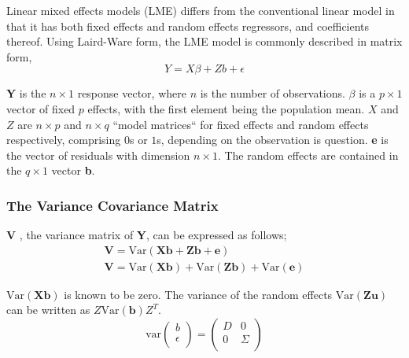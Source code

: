\documentclass[12pt, a4paper]{report}
\theoremstyle{plain}
\theoremstyle{definition}
\theoremstyle{remark}
\begin{document}
	Linear mixed effects models (LME)
	differs from the conventional linear model in that it has both
	fixed effects and random effects regressors, and coefficients
	thereof. 	Using Laird-Ware form, the LME model is commonly described in matrix form,
	\begin{equation}
	Y = X\beta + Zb + \epsilon
	\label{LW}
	\end{equation}
	
	\textbf{Y} is the $n
	\times 1$ response vector, where  $n$ is the number of observations. \textbf{$\beta$} is a $p \times 1$ vector of fixed $p$ effects, with the
	first element being the population mean. $X$ and $Z$ are $n \times p$ and $n \times q$ ``model matrices`` for fixed effects and random effects respectively, comprising
	$0$s or $1$s, depending on the observation is question. \textbf{e} is the vector of residuals with
	dimension $n \times 1$. The random effects are contained in the  $q \times
	1$ vector \textbf{b}.
	
	
	
	
	
	
	\subsubsection{The Variance Covariance Matrix}
	\textbf{V} , the variance matrix of \textbf{Y}, can be expressed
	as follows;
	\begin{eqnarray}
	\textbf{V}= \textrm{Var} ( \textbf{Xb} + \textbf{Zb} + \textbf{e})\\
	\textbf{V}= \textrm{Var} ( \textbf{Xb} ) + \textrm{Var} (\textbf{Zb}) +
	\textrm{Var}(\textbf{e})
	\end{eqnarray}
	
	$\mbox{Var}(\textbf{Xb})$ is known to be zero. The variance of the
	random effects $\mbox{Var}(\textbf{Zu})$ can be written as
	$Z\mbox{Var}(\textbf{b})Z^{T}$.
	\[
	\mathrm{var}
	\left(
	\begin{array}{c}
	b \\
	\epsilon \\
	\end{array}
	\right)
	=
	\left(
	\begin{array}{cc}
	D & 0 \\
	0 & \Sigma \\
	\end{array}
	\right)
	\]
	
\end{document}
